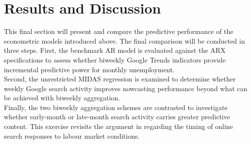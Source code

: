 \documentclass[12pt,a4paper]{article}
\begin{document}
\section{Results and Discussion}
This final section will present and compare the predictive
performance of the econometric models introduced above. The final comparison will be conducted in three steps.
First, the benchmark AR model is evaluated against the ARX
specifications to assess whether biweekly Google Trends indicators provide
incremental predictive power for monthly unemployment. \\
Second, the unrestricted MIDAS regression is examined to determine whether weekly
Google search activity improves nowcasting performance beyond what can be
achieved with biweekly aggregation. \\
Finally, the two biweekly aggregation schemes are contrasted to investigate
whether early-month or late-month search activity carries greater predictive
content. This exercise revisits the argument in \citet{Askitas} regarding the
timing of online search responses to labour market conditions.
\end{document}
